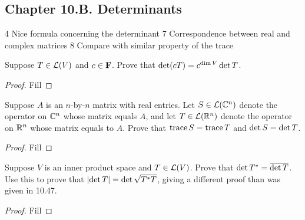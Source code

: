 \subsection*{Chapter 10.B. Determinants}

4 Nice formula concerning the determinant
7 Correspondence between real and complex matrices
8 Compare with similar property of the trace

\begin{exercise}{4}
  Suppose $T\in\mathcal{L}(V)$ and $c\in\mathbf{F}$. Prove that $\operatorname*{det}(cT)=c^{\dim V}\operatorname*{det} T$.
\end{exercise}
\begin{proof}
 Fill
\end{proof}

\begin{exercise}{7}
  Suppose $A$ is an $n$-by-$n$ matrix with real entries. Let $S\in\mathcal{L}(\mathbb{C}^n)$ denote the operator on $\mathbb{C}^n$ whose matrix equals $A$, and let $T\in\mathcal{L}(\mathbb{R}^n)$ denote the operator on $\mathbb{R}^n$ whose matrix equals to $A$. Prove that $\operatorname*{trace} S=\operatorname*{trace} T$ and $\operatorname*{det} S=\operatorname*{det} T$.
\end{exercise}
\begin{proof}
 Fill
\end{proof}

\begin{exercise}{8}
  Suppose $V$ is an inner product space and $T\in\mathcal{L}(V)$. Prove that $\operatorname*{det} T^\ast=\overline{\operatorname*{det} T}$. Use this to prove that $\left\lvert \operatorname*{det} T\right\rvert=\operatorname*{det}\sqrt{T^\ast T}$, giving a different proof than was given in 10.47.
\end{exercise}
\begin{proof}
 Fill
\end{proof}